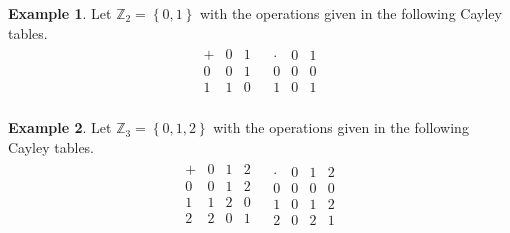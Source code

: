 \documentclass[
]{book}
\theoremstyle{definition}
\theoremstyle{definition}
\newtheorem{example}{Example}[chapter]
\theoremstyle{definition}
\theoremstyle{definition}
\theoremstyle{remark}
\begin{document}
\begin{example}
\protect\hypertarget{exm:z2ring}{}\label{exm:z2ring}Let \(\mathbb{Z}_2=\left\{ 0,1 \right\}\) with the operations given in the following Cayley tables.
\[\begin{array}{cc}
\begin{array}{c|cc}
+ & 0 & 1 \\ \hline
0 & 0 & 1 \\
1 & 1 & 0 \\
\end{array}
&
\begin{array}{c|cc}
\cdot & 0 & 1 \\ \hline
0 & 0 & 0 \\
1 & 0 & 1 \\
\end{array}
\end{array}\]
\end{example}

\begin{example}
\protect\hypertarget{exm:z3ring}{}\label{exm:z3ring}Let \(\mathbb{Z}_3=\left\{ 0,1, 2 \right\}\) with the operations given in the following Cayley tables.
\[\begin{array}{cc}
\begin{array}{c|ccc}
+ & 0 & 1 & 2 \\ \hline
0 & 0 & 1 & 2\\
1 & 1 & 2 & 0 \\
2 & 2 & 0 & 1 \\
\end{array} &
\begin{array}{c|ccc}
\cdot & 0 & 1 & 2\\ \hline
0 & 0 & 0  & 0 \\
1 & 0 & 1 & 2 \\
2 & 0 & 2 & 1
\end{array} \\
\end{array}\]
\end{example}
\end{document}
